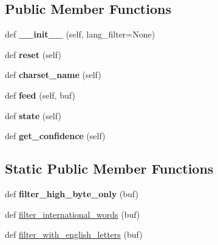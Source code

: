 \subsection*{Public Member Functions}
\begin{DoxyCompactItemize}
\item 
\mbox{\label{classchardet_1_1charsetprober_1_1_char_set_prober_a1487cedaebad1186b7d729dfd6d49bd8}} 
def {\bfseries \+\_\+\+\_\+init\+\_\+\+\_\+} (self, lang\+\_\+filter=None)
\item 
\mbox{\label{classchardet_1_1charsetprober_1_1_char_set_prober_ae9cb0d0db668b9bb0d9e3e15c26d7d62}} 
def {\bfseries reset} (self)
\item 
\mbox{\label{classchardet_1_1charsetprober_1_1_char_set_prober_a1e13ed02e9c4e0e696ceb2049dee6562}} 
def {\bfseries charset\+\_\+name} (self)
\item 
\mbox{\label{classchardet_1_1charsetprober_1_1_char_set_prober_a089dd79235ab8176a493d6943f664128}} 
def {\bfseries feed} (self, buf)
\item 
\mbox{\label{classchardet_1_1charsetprober_1_1_char_set_prober_abf9c104599601203b9d90bd6163f1140}} 
def {\bfseries state} (self)
\item 
\mbox{\label{classchardet_1_1charsetprober_1_1_char_set_prober_a5e749f20315e8f9ab35a3d3efeb78e96}} 
def {\bfseries get\+\_\+confidence} (self)
\end{DoxyCompactItemize}
\subsection*{Static Public Member Functions}
\begin{DoxyCompactItemize}
\item 
\mbox{\label{classchardet_1_1charsetprober_1_1_char_set_prober_ae10731713ce65b0fb2d6341b3c7baf89}} 
def {\bfseries filter\+\_\+high\+\_\+byte\+\_\+only} (buf)
\item 
def \hyperlink{classchardet_1_1charsetprober_1_1_char_set_prober_a950ce6a8b558bd6dedb10a699ab45338}{filter\+\_\+international\+\_\+words} (buf)
\item 
def \hyperlink{classchardet_1_1charsetprober_1_1_char_set_prober_a96f182884544af20f7b45eb1744aaab6}{filter\+\_\+with\+\_\+english\+\_\+letters} (buf)
\end{DoxyCompactItemize}
